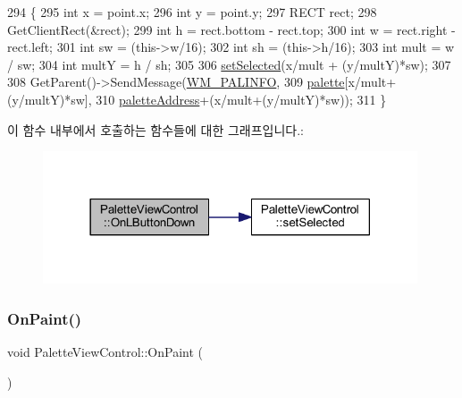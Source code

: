 \begin{DoxyCode}
294 \{
295   \textcolor{keywordtype}{int} x = point.x;
296   \textcolor{keywordtype}{int} y = point.y;
297   RECT rect;
298   GetClientRect(&rect);
299   \textcolor{keywordtype}{int} h = rect.bottom - rect.top;
300   \textcolor{keywordtype}{int} w = rect.right - rect.left;
301   \textcolor{keywordtype}{int} sw = (this->w/16);
302   \textcolor{keywordtype}{int} sh = (this->h/16);
303   \textcolor{keywordtype}{int} mult = w / sw;
304   \textcolor{keywordtype}{int} multY = h / sh;
305 
306   \mbox{\hyperlink{class_palette_view_control_afe3570f3d0bf905f25977346a50dec7f}{setSelected}}(x/mult + (y/multY)*sw);
307   
308   GetParent()->SendMessage(\mbox{\hyperlink{_palette_view_control_8h_aab2f2ea29095251b86d7fb5d93051bc5}{WM\_PALINFO}},
309                            \mbox{\hyperlink{class_palette_view_control_a1a5ce1812cf6c8d26889f4eb03d1d4ec}{palette}}[x/mult+(y/multY)*sw],
310                            \mbox{\hyperlink{class_palette_view_control_a53b2efd4174e06a68e545608e458947b}{paletteAddress}}+(x/mult+(y/multY)*sw));
311 \}
\end{DoxyCode}
이 함수 내부에서 호출하는 함수들에 대한 그래프입니다.\+:
\nopagebreak
\begin{figure}[H]
\begin{center}
\leavevmode
\includegraphics[width=314pt]{class_palette_view_control_a766a44e9b018fc6c87f81f3c0fdd6c6e_cgraph}
\end{center}
\end{figure}
\mbox{\label{class_palette_view_control_ab68c1927e30e1b35b207d6884ef9822d}} 
\subsubsection{\texorpdfstring{On\+Paint()}{OnPaint()}}
{\footnotesize\ttfamily void Palette\+View\+Control\+::\+On\+Paint (\begin{DoxyParamCaption}{ }\end{DoxyParamCaption})\hspace{0.3cm}{\ttfamily [protected]}}



